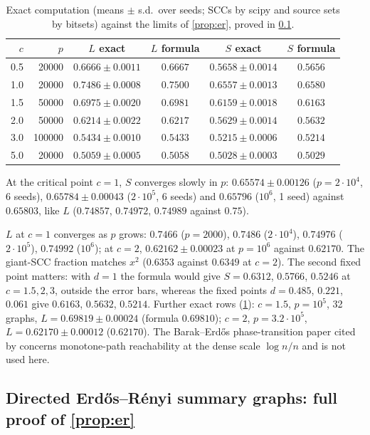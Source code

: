 \begin{table}[h]
\caption{Exact computation (means $\pm$ s.d.\ over seeds; SCCs by scipy and source sets by bitsets) against the limits of \cref{prop:er}, proved in \cref{app:erproof}.}
\label{tab:er}
\centering
\begin{tabular}{rrcccc}
\toprule
$c$ & $p$ & $L$ exact & $L$ formula & $S$ exact & $S$ formula \\
\midrule
0.5 & 20000 & $0.6666\pm0.0011$ & $0.6667$ & $0.5658\pm0.0014$ & $0.5656$ \\
1.0 & 20000 & $0.7486\pm0.0008$ & $0.7500$ & $0.6557\pm0.0013$ & $0.6580$ \\
1.5 & 50000 & $0.6975\pm0.0020$ & $0.6981$ & $0.6159\pm0.0018$ & $0.6163$ \\
2.0 & 50000 & $0.6214\pm0.0022$ & $0.6217$ & $0.5629\pm0.0014$ & $0.5632$ \\
3.0 & 100000 & $0.5434\pm0.0010$ & $0.5433$ & $0.5215\pm0.0006$ & $0.5214$ \\
5.0 & 20000 & $0.5059\pm0.0005$ & $0.5058$ & $0.5028\pm0.0003$ & $0.5029$ \\
\bottomrule
\end{tabular}
\end{table}
At the critical point $c=1$, $S$ converges slowly in $p$: $0.65574\pm0.00126$ ($p=2\cdot10^4$, 6 seeds),
$0.65784\pm0.00043$ ($2\cdot10^5$, 6 seeds) and $0.65796$ ($10^6$, 1 seed) against $0.65803$, like $L$
($0.74857$, $0.74972$, $0.74989$ against $0.75$).

$L$ at $c=1$ converges as $p$ grows: $0.7466$ ($p=2000$), $0.7486$ ($2\cdot10^4$),
$0.74976$ ($2\cdot10^5$), $0.74992$ ($10^6$); at $c=2$, $0.62162\pm0.00023$ at
$p=10^6$ against $0.62170$. The giant-SCC fraction matches $x^2$ ($0.6353$ against
$0.6349$ at $c=2$). The second fixed point matters: with $d=1$ the formula would
give $S=0.6312$, $0.5766$, $0.5246$ at $c=1.5,2,3$, outside the error bars,
whereas the fixed points $d=0.485$, $0.221$, $0.061$ give $0.6163$, $0.5632$,
$0.5214$. Further exact rows (\cref{tab:er}): $c=1.5$, $p=10^5$, 32 graphs, $L=0.69819\pm0.00024$
(formula $0.69810$); $c=2$, $p=3.2\cdot10^5$, $L=0.62170\pm0.00012$ ($0.62170$).
The Barak--Erd\H{o}s phase-transition paper cited by \citet{reisach2026topological}
concerns monotone-path reachability at the dense scale $\log n/n$ and is not
used here.

\subsection{Directed Erd\H{o}s--R\'enyi summary graphs: full proof of \cref{prop:er}}
\label{app:erproof}


